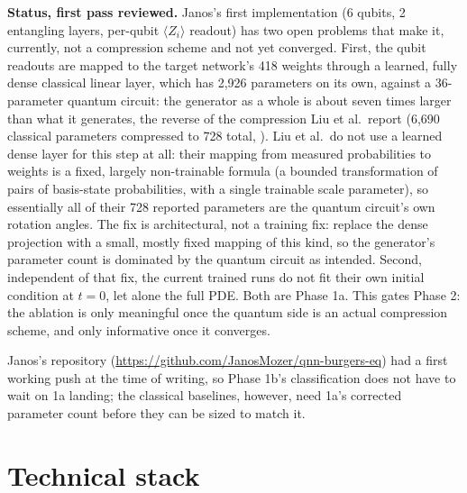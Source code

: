 \documentclass[10pt,a4paper]{article}
\begin{document}
\textbf{Status, first pass reviewed.} Janos's first implementation (6 qubits, 2 entangling layers, per-qubit $\langle Z_i \rangle$ readout) has two open problems that make it, currently, not a compression scheme and not yet converged. First, the qubit readouts are mapped to the target network's 418 weights through a learned, fully dense classical linear layer, which has 2,926 parameters on its own, against a 36-parameter quantum circuit: the generator as a whole is about seven times larger than what it generates, the reverse of the compression Liu et al.\ report (6,690 classical parameters compressed to 728 total, \cite{liu2024}). Liu et al.\ do not use a learned dense layer for this step at all: their mapping from measured probabilities to weights is a fixed, largely non-trainable formula (a bounded transformation of pairs of basis-state probabilities, with a single trainable scale parameter), so essentially all of their 728 reported parameters are the quantum circuit's own rotation angles. The fix is architectural, not a training fix: replace the dense projection with a small, mostly fixed mapping of this kind, so the generator's parameter count is dominated by the quantum circuit as intended. Second, independent of that fix, the current trained runs do not fit their own initial condition at $t=0$, let alone the full PDE. Both are Phase 1a. This gates Phase 2: the ablation is only meaningful once the quantum side is an actual compression scheme, and only informative once it converges.

Janos's repository (\url{https://github.com/JanosMozer/qnn-burgers-eq}) had a first working push at the time of writing, so Phase 1b's classification does not have to wait on 1a landing; the classical baselines, however, need 1a's corrected parameter count before they can be sized to match it.

\section{Technical stack}
\end{document}

